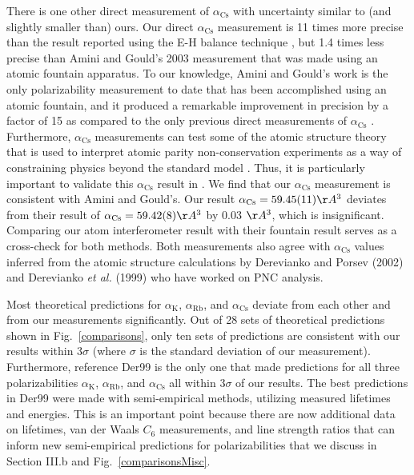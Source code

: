 \documentclass[twocolumn,prl,showpacs,superscriptaddress,longbibliography]{revtex4-1}   %
\newcommand{\figref}[1]{Fig.~\ref{#1}}
\newcommand{\ak}{\alpha_{\textrm{K}}}
\newcommand{\arb}{\alpha_{\textrm{Rb}}}
\newcommand{\acs}{\alpha_{\textrm{Cs}}}
\newcommand{\etalspace}{\textit{et al. }}
\begin{document}
There is one other direct measurement of $\acs$ with uncertainty similar to (and slightly smaller than) ours.  Our direct $\acs$ measurement is 11 times more precise than the result reported using the E-H balance technique \cite{Molof1974a}, but 1.4 times less precise than Amini and Gould's 2003 measurement \cite{Amini2003} that was made using an atomic fountain apparatus.
To our knowledge, Amini and Gould's work is the only polarizability measurement to date that has been accomplished using an atomic fountain, and it produced a remarkable improvement in precision by a factor of 15 as compared to the only previous direct measurements of $\acs$ \cite{Molof1974a,Hall1974}.  Furthermore, $\acs$ measurements can test some of the atomic structure theory that is used to interpret atomic parity non-conservation experiments as a way of constraining physics beyond the standard model \cite{Blundell1992,Cho1997,Derevianko2001,Porsev2009}. Thus, it is particularly important to validate this $\acs$ result in \cite{Amini2003}.  We find that our $\acs$ measurement is consistent with Amini and Gould's.  Our result $\acs = 59.45(11) \AA^3$ deviates from their result of $\acs = 59.42(8) \AA^3$ by 0.03 $\AA^3$, which is insignificant.  Comparing our atom interferometer result with their fountain result serves as a cross-check for both methods.
Both measurements also agree with $\acs$ values inferred from the atomic structure calculations by Derevianko and Porsev (2002) \cite{Derevianko2001} and Derevianko \etalspace (1999) \cite{Derevianko1998} who have worked on PNC analysis.




Most theoretical predictions for $\ak$, $\arb$, and $\acs$ deviate from each other and from our measurements significantly.   Out of 28 sets of theoretical predictions shown in \figref{comparisons}, only ten sets of predictions \cite{Derevianko1998,Derevianko2001,Iskrenova-Tchoukova2007,Safronova2008,Safronova2011,
Nandy2012,Jiang2013,Sahoo2013,
Safronova2013,Borschevsky2013} are consistent with our results within 3$\sigma$ (where $\sigma$ is the standard deviation of our measurement). Furthermore, reference Der99 \cite{Derevianko1998} is the only one that made predictions for all three polarizabilities $\ak$, $\arb$, and $\acs$ all within 3$\sigma$ of our results. The best predictions in Der99 were made with semi-empirical methods, utilizing measured lifetimes and energies.  This is an important point because there are now additional data on lifetimes, van der Waals $C_6$ measurements, and line strength ratios that can inform new semi-empirical predictions for polarizabilities that we discuss in Section III.b and \figref{comparisonsMisc}.
\end{document}
